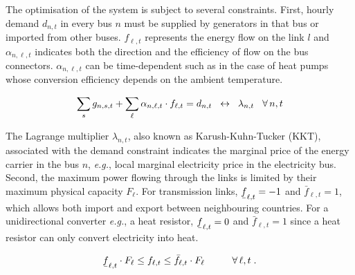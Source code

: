 \documentclass[3p]{elsarticle} %
\newcommand{\ubar}[1]{\text{\b{$#1$}}}
\begin{document}
The optimisation of the system is subject to several constraints. First, hourly demand $d_{n,t}$ in every bus $n$ must be supplied by generators in that bus or imported from other buses. $f_{\ell,t}$ represents the energy flow on the link $l$ and $\alpha_{n,\ell,t}$ indicates both the direction and the efficiency of flow on the bus connectors.  $\alpha_{n,\ell,t}$ can be time-dependent such as in the case of heat pumps whose conversion efficiency depends on the ambient temperature.

\begin{equation}
\sum_{s} g_{n,s,t}+ \sum_{\ell} \alpha_{n,\ell,t}\cdot f_{\ell,t} = d_{n,t} \hspace{.2cm} \leftrightarrow \hspace{0.2cm} \lambda_{n,t} \hspace{.3cm} \forall\, n,t \label{eq_energy_balance}
\end{equation}

The Lagrange multiplier $\lambda_{n,t}$,  also known as Karush-Kuhn-Tucker (KKT),  associated with the demand constraint indicates the marginal price of the energy carrier in the bus $n$, \textit{e.g.}, local marginal electricity price in the electricity bus. \\

Second, the maximum power flowing through the links is limited by their maximum physical capacity $F_{\ell}$. For transmission links, $\ubar{f}_{\ell,t}=-1$ and $\bar{f}_{\ell,t}=1$, which allows both import and export between neighbouring countries. For a unidirectional converter \textit{e.g.}, a heat resistor, $\ubar{f}_{\ell,t}=0$ and $\bar{f}_{\ell,t}=1$ since a heat resistor can only convert electricity into heat.

\begin{equation}
\ubar{f}_{\ell,t} \cdot F_{\ell} \leq f_{\ell,t} \leq \bar{f}_{\ell,t} \cdot F_{\ell} \hspace{1cm} \forall\, \ell,t \; . \label{eq_links}
\end{equation}

\end{document}
